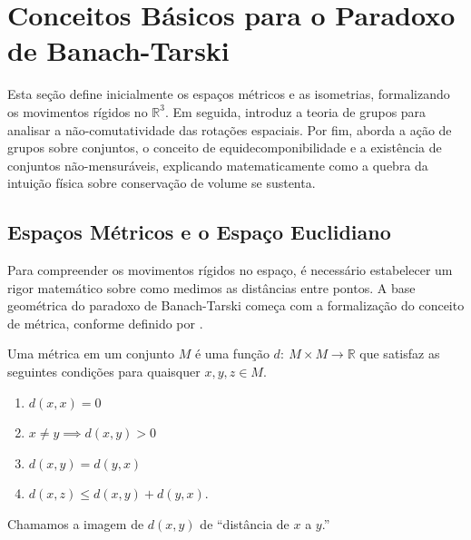 


\section{Conceitos Básicos para o Paradoxo de Banach-Tarski}
\label{sec:conceitos_basicos_banach}

Esta seção define inicialmente os espaços métricos e as isometrias, formalizando os movimentos rígidos no \(\mathbb{R}^3\). Em seguida, introduz a teoria de grupos para analisar a não-comutatividade das rotações espaciais. Por fim, aborda a ação de grupos sobre conjuntos, o conceito de equidecomponibilidade e a existência de conjuntos não-mensuráveis, explicando matematicamente como a quebra da intuição física sobre conservação de volume se sustenta.

\subsection{Espaços Métricos e o Espaço Euclidiano}
\label{subsec:espacos_metricos}

Para compreender os movimentos rígidos no espaço, é necessário estabelecer um rigor matemático sobre como medimos as distâncias entre pontos. A base geométrica do paradoxo de Banach-Tarski começa com a formalização do conceito de métrica, conforme definido por \textcite{lima2014}.

\begin{definicao}[Métrica]
    Uma métrica em um conjunto \(M\) é uma função \(d: \ M \times M \to \mathbb{R}\) que satisfaz as seguintes condições para quaisquer \(x,y,z \in M\).
    \begin{enumerate}
        \item \(d(x,x) = 0\)
        \item \(x \neq y \implies d(x,y) > 0\)
        \item \(d(x,y) = d(y,x)\)
        \item \(d(x,z) \leq d(x,y) + d(y,x).\)
    \end{enumerate}
    Chamamos a imagem de \(d(x,y)\) de ``distância de \(x\) a \(y\).''
\end{definicao}

